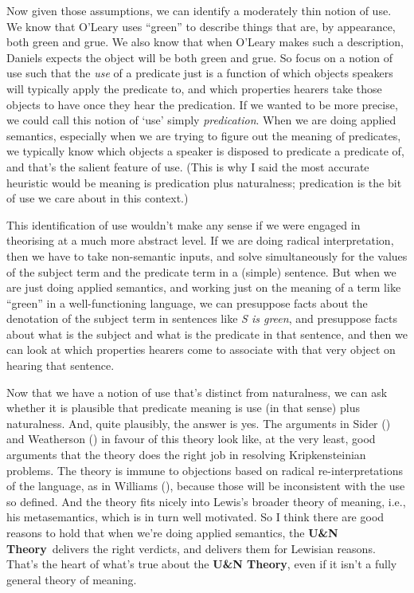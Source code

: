 \documentclass[
  10pt,
  letterpaper,
  DIV=11,
  numbers=noendperiod,
  twoside]{scrartcl}
\begin{document}
Now given those assumptions, we can identify a moderately thin notion of
use. We know that O'Leary uses ``green'' to describe things that are, by
appearance, both green and grue. We also know that when O'Leary makes
such a description, Daniels expects the object will be both green and
grue. So focus on a notion of use such that the \emph{use} of a
predicate just is a function of which objects speakers will typically
apply the predicate to, and which properties hearers take those objects
to have once they hear the predication. If we wanted to be more precise,
we could call this notion of `use' simply \emph{predication}. When we
are doing applied semantics, especially when we are trying to figure out
the meaning of predicates, we typically know which objects a speaker is
disposed to predicate a predicate of, and that's the salient feature of
use. (This is why I said the most accurate heuristic would be meaning is
predication plus naturalness; predication is the bit of use we care
about in this context.)

This identification of use wouldn't make any sense if we were engaged in
theorising at a much more abstract level. If we are doing radical
interpretation, then we have to take non-semantic inputs, and solve
simultaneously for the values of the subject term and the predicate term
in a (simple) sentence. But when we are just doing applied semantics,
and working just on the meaning of a term like ``green'' in a
well-functioning language, we can presuppose facts about the denotation
of the subject term in sentences like \emph{S is green}, and presuppose
facts about what is the subject and what is the predicate in that
sentence, and then we can look at which properties hearers come to
associate with that very object on hearing that sentence.

Now that we have a notion of use that's distinct from naturalness, we
can ask whether it is plausible that predicate meaning is use (in that
sense) plus naturalness. And, quite plausibly, the answer is yes. The
arguments in Sider () and
Weatherson () in favour of
this theory look like, at the very least, good arguments that the theory
does the right job in resolving Kripkensteinian problems. The theory is
immune to objections based on radical re-interpretations of the
language, as in Williams (), because
those will be inconsistent with the use so defined. And the theory fits
nicely into Lewis's broader theory of meaning, i.e., his metasemantics,
which is in turn well motivated. So I think there are good reasons to
hold that when we're doing applied semantics, the \textbf{U\&N
Theory}~delivers the right verdicts, and delivers them for Lewisian
reasons. That's the heart of what's true about the \textbf{U\&N Theory},
even if it isn't a fully general theory of meaning.
\end{document}
